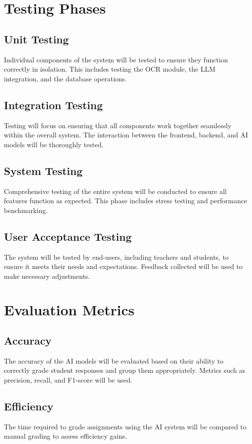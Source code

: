 \documentclass[ms,twoside,print]{nuthesis}
\begin{document}
\section{Testing Phases}
\subsection{Unit Testing}
Individual components of the system will be tested to ensure they function correctly in isolation. This includes testing the OCR module, the LLM integration, and the database operations.

\subsection{Integration Testing}
Testing will focus on ensuring that all components work together seamlessly within the overall system. The interaction between the frontend, backend, and AI models will be thoroughly tested.

\subsection{System Testing}
Comprehensive testing of the entire system will be conducted to ensure all features function as expected. This phase includes stress testing and performance benchmarking.

\subsection{User Acceptance Testing}
The system will be tested by end-users, including teachers and students, to ensure it meets their needs and expectations. Feedback collected will be used to make necessary adjustments.

\section{Evaluation Metrics}
\subsection{Accuracy}
The accuracy of the AI models will be evaluated based on their ability to correctly grade student responses and group them appropriately. Metrics such as precision, recall, and F1-score will be used.

\subsection{Efficiency}
The time required to grade assignments using the AI system will be compared to manual grading to assess efficiency gains.
\end{document}
